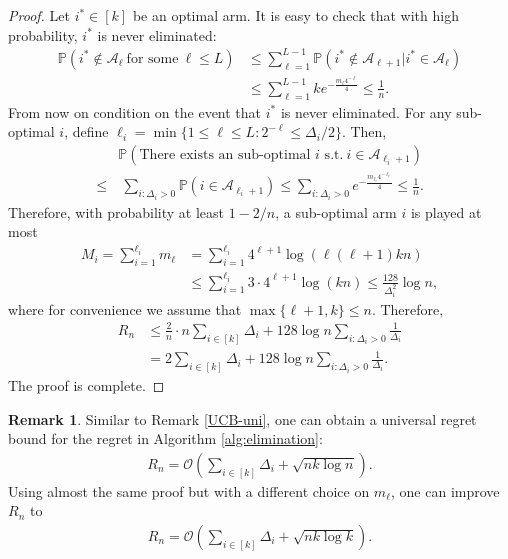 \documentclass[letterpaper,11pt,openright,openany]{book}
\numberwithin{equation}{section}
\theoremstyle{plain}
\theoremstyle{definition}
\newtheorem{Rem}[Th]{Remark}
\def\P{{\mathbb P}}
\begin{document}
\begin{proof}
Let $i^*\in [k]$ be an optimal arm. It is easy to check that with high probability, $i^*$ is never eliminated:
\begin{align*}
\P\left(i^*\notin\mathcal A_\ell \ \text{for some}\ \ell\leq L\right)&\leq\sum_{\ell = 1}^{L-1}\P\left(i^*\notin\mathcal A_{\ell+1}| i^*\in\mathcal A_\ell\right)\\
&\leq\sum_{\ell=1}^{L-1}ke^{-\frac{m_\ell4^{-\ell}}{4}}\leq\frac{1}{n}. 
\end{align*}
From now on condition on the event that $i^*$ is never eliminated. For any sub-optimal $i$, define $\ell_i=\min\{1\leq \ell\leq L: 2^{-\ell}\leq\Delta_i/2\}$. Then,
\begin{align*}
&\P\left(\text{There exists an sub-optimal $i$ s.t.}\ i\in\mathcal A_{\ell_i+1}\right)\\
\leq&\ \sum_{i: \Delta_i>0}\P\left(i\in\mathcal A_{\ell_i+1}\right)\leq\sum_{i: \Delta_i>0}e^{-\frac{m_{\ell_i}4^{-\ell_i}}{4}}\leq\frac{1}{n}. 
\end{align*} 
Therefore, with probability at least $1-2/n$, a sub-optimal arm $i$ is played at most
\begin{align*}
M_i = \sum_{i=1}^{\ell_i}m_\ell&=\sum_{i=1}^{\ell_i}4^{\ell+1}\log(\ell(\ell+1)kn)\\
&\leq\sum_{i=1}^{\ell_i}3\cdot 4^{\ell+1}\log(kn)\leq \frac{128}{\Delta_i^2}\log n, 
\end{align*} 
where for convenience we assume that $\max\{\ell+1, k\}\leq n$. Therefore,
\begin{align*}
R_n&\leq\frac{2}{n}\cdot n\sum_{i\in [k]}\Delta_i + 128\log n\sum_{i: \Delta_i>0}\frac{1}{\Delta_i}\\
& = 2\sum_{i\in [k]}\Delta_i + 128\log n\sum_{i: \Delta_i>0}\frac{1}{\Delta_i}. 
\end{align*}
The proof is complete.
\end{proof}

\begin{Rem}
Similar to Remark \ref{UCB-uni}, one can obtain a universal regret bound for the regret in Algorithm \ref{alg:elimination}:
\begin{align*}
R_n=\mathcal O\left(\sum_{i\in [k]}\Delta_i + \sqrt{nk\log n}\right). 
\end{align*} 
Using almost the same proof but with a different choice on $m_\ell$, one can improve $R_n$ to
\begin{align*}
R_n=\mathcal O\left(\sum_{i\in [k]}\Delta_i + \sqrt{nk\log k}\right). 
\end{align*}  
\end{Rem}
\end{document}
